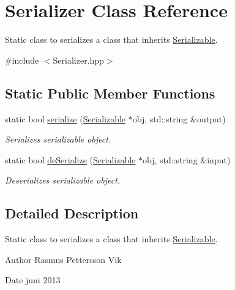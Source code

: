 \hypertarget{class_serializer}{\section{Serializer Class Reference}
\label{class_serializer}
}


Static class to serializes a class that inherits \hyperlink{class_serializable}{Serializable}.  




{\ttfamily \#include $<$Serializer.\-hpp$>$}

\subsection*{Static Public Member Functions}
\begin{DoxyCompactItemize}
\item 
static bool \hyperlink{class_serializer_abdb1edae5fe52a2241578bcadae9d265}{serialize} (\hyperlink{class_serializable}{Serializable} $\ast$obj, std\-::string \&output)
\begin{DoxyCompactList}\small\item\em Serializes serializable object. \end{DoxyCompactList}\item 
static bool \hyperlink{class_serializer_a8ee632af50c7ea6a208d3c279b1b39fc}{de\-Serialize} (\hyperlink{class_serializable}{Serializable} $\ast$obj, std\-::string \&input)
\begin{DoxyCompactList}\small\item\em Deserializes serializable object. \end{DoxyCompactList}\end{DoxyCompactItemize}


\subsection{Detailed Description}
Static class to serializes a class that inherits \hyperlink{class_serializable}{Serializable}. 

\begin{DoxyAuthor}{Author}
Rasmus Pettersson Vik 
\end{DoxyAuthor}
\begin{DoxyDate}{Date}
juni 2013 
\end{DoxyDate}



